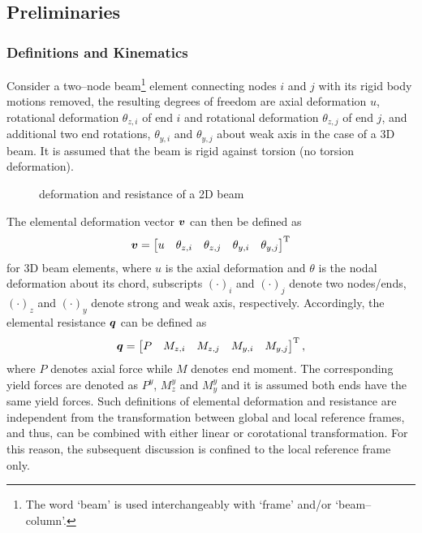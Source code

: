 \subsection{Preliminaries}
\subsubsection{Definitions and Kinematics}
Consider a two--node beam\footnote{The word `beam' is used interchangeably with `frame' and/or `beam--column'.} element connecting nodes $i$ and $j$ with its rigid body motions removed, the resulting degrees of freedom are axial deformation $u$, rotational deformation $\theta_{z,i}$ of end $i$ and rotational deformation $\theta_{z,j}$ of end $j$, and additional two end rotations, $\theta_{y,i}$ and $\theta_{y,j}$ about weak axis in the case of a 3D beam.
It is assumed that the beam is rigid against torsion (no torsion deformation).
\begin{figure}[H]
\centering
{}
\caption{deformation and resistance of a 2D beam}
\end{figure}

The elemental deformation vector $\bm{v}$ can then be defined as
\begin{gather}
\bm{v}=\begin{bmatrix}
u&\theta_{z,i}&\theta_{z,j}&\theta_{y,i}&\theta_{y,j}
\end{bmatrix}^{\mathrm{T}}
\end{gather}
for 3D beam elements, where $u$ is the axial deformation and $\theta$ is the nodal deformation about its chord, subscripts $\left(\cdot\right)_i$ and $\left(\cdot\right)_j$ denote two nodes/ends, $\left(\cdot\right)_z$ and $\left(\cdot\right)_y$ denote strong and weak axis, respectively.
Accordingly, the elemental resistance $\bm{q}$ can be defined as
\begin{gather}
\bm{q}=\begin{bmatrix}
P&M_{z,i}&M_{z,j}&M_{y,i}&M_{y,j}
\end{bmatrix}^{\mathrm{T}},
\end{gather}
where $P$ denotes axial force while $M$ denotes end moment.
The corresponding yield forces are denoted as $P^y$, $M_z^y$ and $M_y^y$ and it is assumed both ends have the same yield forces.
Such definitions of elemental deformation and resistance are independent from the transformation between global and local reference frames, and thus, can be combined with either linear or corotational transformation.
For this reason, the subsequent discussion is confined to the local reference frame only.

